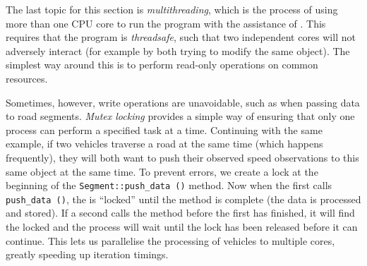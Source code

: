 The last topic for this section is \emph{multithreading}, which is the process of using more than one CPU core to run the program with the assistance of  \citep{OMP}. This requires that the program is \emph{threadsafe}, such that two independent cores will not adversely interact (for example by both trying to modify the same object). The simplest way around this is to perform read-only operations on common resources.

Sometimes, however, write operations are unavoidable, such as when passing data to road segments. \emph{Mutex locking} provides a simple way of ensuring that only one process can perform a specified task at a time. Continuing with the same example, if two vehicles traverse a road at the same time (which happens frequently), they will both want to push their observed speed observations to this same  object at the same time. To prevent errors, we create a lock at the beginning of the \verb+Segment::push_data ()+ method. Now when the first  calls \verb+push_data ()+, the  is ``locked'' until the method is complete (the data is processed and stored). If a second  calls the method before the first has finished, it will find the  locked and the process will wait until the lock has been released before it can continue. This lets us parallelise the processing of vehicles to multiple cores, greatly speeding up iteration timings.
